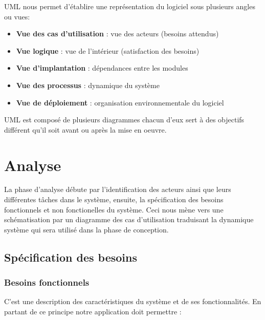 UML nous permet d'établire une représentation du logiciel sous plusieurs angles ou vues:

\begin{itemize}
    \item \textbf{Vue des cas d’utilisation} : vue des acteurs (besoins attendus)
    \item \textbf{Vue logique} : vue de l'intérieur (satisfaction des besoins)
    \item \textbf{Vue d’implantation} : dépendances entre les modules
    \item \textbf{Vue des processus} : dynamique du système
    \item \textbf{Vue de déploiement} : organisation environnementale du logiciel
\end{itemize}

UML est composé de plusieurs diagrammes chacun d'eux sert à des objectifs différent qu'il soit avant ou après la mise en oeuvre.

\section{Analyse}
La phase d’analyse débute par l'identification des acteurs ainsi que leurs différentes tâches dans le système, ensuite, la spécification des besoins fonctionnels et non fonctionelles du système. Ceci nous mène vers une schématisation par un diagramme des cas d’utilisation traduisant la dynamique système qui sera utilisé dans la phase de conception.


\subsection{Spécification des besoins}
\subsubsection{Besoins fonctionnels}
C’est une description des caractéristiques du système et de ses fonctionnalités. En partant de ce principe notre application doit permettre :\\

